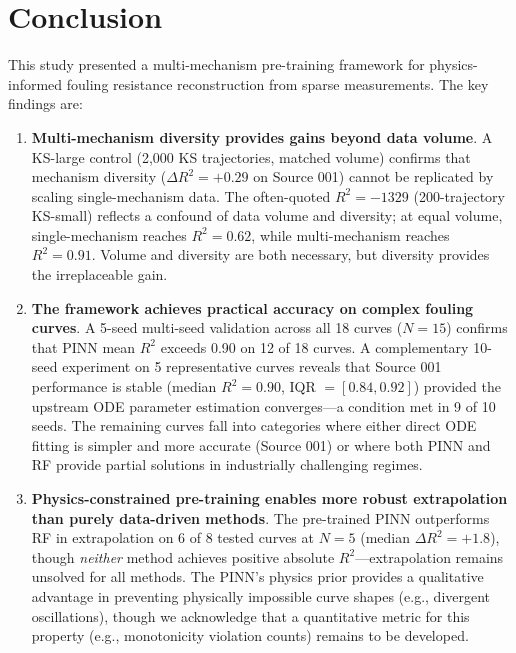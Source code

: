 \documentclass[review]{elsarticle}
\begin{document}
\section{Conclusion}

This study presented a multi-mechanism pre-training framework for physics-informed fouling resistance reconstruction from sparse measurements. The key findings are:

\begin{enumerate}
\item \textbf{Multi-mechanism diversity provides gains beyond data volume}. A KS-large control (2,000 KS trajectories, matched volume) confirms that mechanism diversity ($\Delta R^2 = +0.29$ on Source 001) cannot be replicated by scaling single-mechanism data. The often-quoted $R^2 = -1329$ (200-trajectory KS-small) reflects a confound of data volume and diversity; at equal volume, single-mechanism reaches $R^2 = 0.62$, while multi-mechanism reaches $R^2 = 0.91$. Volume and diversity are both necessary, but diversity provides the irreplaceable gain.
\item \textbf{The framework achieves practical accuracy on complex fouling curves}. A 5-seed multi-seed validation across all 18 curves ($N=15$) confirms that PINN mean $R^2$ exceeds 0.90 on 12 of 18 curves. A complementary 10-seed experiment on 5 representative curves reveals that Source 001 performance is stable (median $R^2 = 0.90$, IQR $= [0.84, 0.92]$) provided the upstream ODE parameter estimation converges---a condition met in 9 of 10 seeds. The remaining curves fall into categories where either direct ODE fitting is simpler and more accurate (Source 001) or where both PINN and RF provide partial solutions in industrially challenging regimes.
\item \textbf{Physics-constrained pre-training enables more robust extrapolation than purely data-driven methods}. The pre-trained PINN outperforms RF in extrapolation on 6 of 8 tested curves at $N=5$ (median $\Delta R^2 = +1.8$), though \textit{neither} method achieves positive absolute $R^2$---extrapolation remains unsolved for all methods. The PINN's physics prior provides a qualitative advantage in preventing physically impossible curve shapes (e.g., divergent oscillations), though we acknowledge that a quantitative metric for this property (e.g., monotonicity violation counts) remains to be developed.

\end{enumerate}
\end{document}
